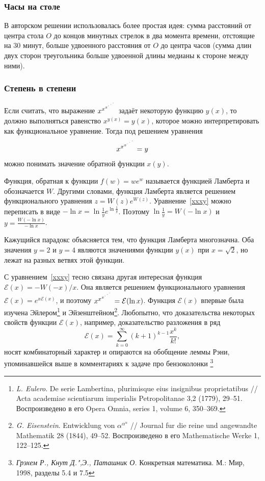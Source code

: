 \documentclass[twoside]{book}
\begin{document}
\subsubsection*{Часы на столе} %
В авторском решении использовалась более простая идея: сумма расстояний от центра стола $O$ до концов минутных стрелок в два момента времени, отстоящие на 30 минут, больше удвоенного расстояния от $O$ до центра часов (сумма длин двух сторон треугольника больше удвоенной длины медианы к стороне между ними).

\subsubsection*{Степень в степени} %
Если считать, что выражение $x^{x^{ x^{{\cdot}^{\mkern2.5mu\cdot^{\mkern2.5mu\cdot}}}}}$ задаёт некоторую функцию $y(x)$, то должно выполняться равенство $x^{y(x)}=y(x)$, которое можно интерпретировать как функциональное уравнение. Тогда под решением  
уравнения 
\begin{equation}
\label{xxxy}
x^{x^{ x^{{\cdot}^{\mkern2.5mu\cdot^{\mkern2.5mu\cdot}}}}}=y
\end{equation}
можно понимать значение обратной функции $x(y).$

Функция,  обратная к функции $f(w)=we^w$  называется функцией Ламберта и обозначается $W$. Другими словами,  функция Ламберта является решением функционального уравнения $z=W(z)e^{W(z)}.$ Уравнение~\eqref{xxxy} можно переписать в виде $-\ln x=\ln\frac{1}{y }e^{\ln\frac{1}{y }}$. Поэтому $\ln\frac{1}{y }=W(-\ln x)$
и
$y=\frac{W(-\ln x)}{ -\ln x}$.

Кажущийся парадокс объясняется тем, что  функция Ламберта многозначна.  Оба значения  $y=2$ и $y=4$ являются значениями функции $y(x)$ при $x=\sqrt{2}$, но лежат на разных ветвях этой функции. 

С уравнением~\eqref{xxxy} тесно связана другая интересная функция
$\mathcal{E}(x)=-W(-x)/x$. Она является решением функционального уравнения
$\mathcal{E}(x)=e^{x\mathcal{E}(x)}$, и поэтому $x^{x^{ x^{{\cdot}^{\mkern2.5mu\cdot^{\mkern2.5mu\cdot}}}}}=\mathcal{E}(\ln x)$. Функция $\mathcal{E}(x)$ впервые была изучена Эйлером\footnote{%
\emph{L. Eulero}. De serie Lambertina, plurimisque eius 
insignibus proprietatibus /\!/ Acta academiae scientiarum imperialis 
Petropolitanae 3,2 (1779), 29--51. Воспроизведено в его Opera 
Omnia, series 1, volume 6, 350--369.}
и Эйзенштейном\footnote{%
\emph{G. Eisenstein}. Entwicklung von $\alpha^{\alpha^{\alpha}}$ /\!/ Journal 
fur die reine und angewandte Mathematik 28 (1844), 49--52. 
Воспроизведено в его Mathematische Werke 1, 122--125.}. 
Любопытно, что доказательства некоторых свойств функции $\mathcal{E}(x)$, например, доказательство разложения в ряд
$$\mathcal{E}(x)=\sum_{k=0}^{\infty}(k+1)^{k-1}\frac{x^k}{ k!},$$
носят комбинаторный характер и опираются на обобщение леммы Рэни, упоминавшейся выше в комментариях к задаче про бензоколонки%
\footnote{\emph{Грэхем Р., Кнут Д.",Э., Паташник О.} Конкретная математика. М.: Мир, 1998, разделы 5.4 и 7.5}
\end{document}

